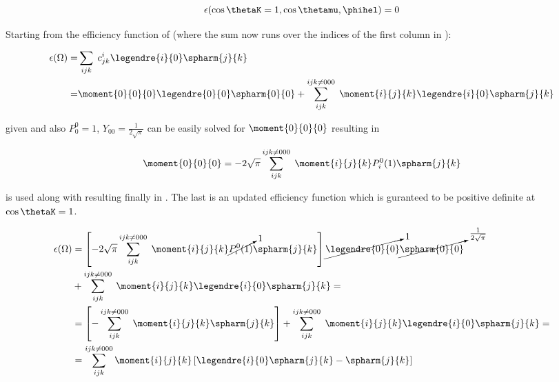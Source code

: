 \begin{center}
\begin{equation}
  \epsilon(\cos\thetaK = 1, \cos\thetamu, \phihel) = 0 
  \label{eff_func_constr}
\end{equation}
\end{center}

\noindent Starting from the efficiency function of  (where the sum now runs over the indices of the first column in ):

\begin{center}
\begin{align}
  \epsilon(\Omega) =& \sum_{ijk} \; c^i_{jk} \legendre{i}{0} \spharm{j}{k} \nonumber \\
                   =& \moment{0}{0}{0} \legendre{0}{0} \spharm{0}{0} + \sum_{ijk}^{ijk\neq 000} \; \moment{i}{j}{k} \legendre{i}{0} \spharm{j}{k}
  \label{eff_func_rewriten}
\end{align}
\end{center}

\noindent given  and also $P_{0}^{0}=1$,  $Y_{00} = \frac{1}{2\sqrt{\pi}}$  can be 
easily solved for $\moment{0}{0}{0}$ resulting in 

\begin{center}
\begin{equation}
  \moment{0}{0}{0} = -2\sqrt{\pi} \sum_{ijk}^{ijk\neq 000} \; \moment{i}{j}{k} P_i^0(1) \spharm{j}{k}
  \label{eff_constr_mom}
\end{equation}
\end{center}

\noindent {} is used along with  resulting finally in . 
The last is an updated efficiency function which is guranteed to be positive definite at $\cos\thetaK=1$. 

\begin{center}
\begin{align}
  \epsilon(\Omega) &= \left[-2\sqrt{\pi} \sum_{ijk}^{ijk\neq 000} \; \moment{i}{j}{k} \cancelto{1}{P_i^0(1)} \spharm{j}{k} \right] \cancelto{1}{\legendre{0}{0}} \cancelto{\frac{1}{2\sqrt{\pi}}}{\spharm{0}{0}} \nonumber \\ 
                   &+ \sum_{ijk}^{ijk\neq 000} \; \moment{i}{j}{k} \legendre{i}{0} \spharm{j}{k} = \nonumber \\
                   &= \left[- \sum_{ijk}^{ijk\neq 000} \; \moment{i}{j}{k} \spharm{j}{k} \right] + \sum_{ijk}^{ijk\neq 000} \; \moment{i}{j}{k} \legendre{i}{0} \spharm{j}{k} = \nonumber\\
                   &= \sum_{ijk}^{ijk\neq 000} \moment{i}{j}{k} \left[ \legendre{i}{0} \spharm{j}{k} - \spharm{j}{k} \right]
  \label{eff_func_final}
\end{align}
\end{center}

